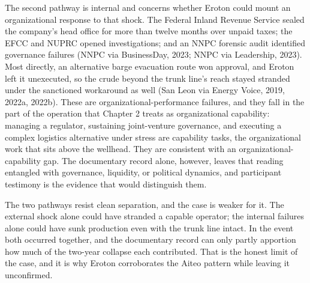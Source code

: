 The second pathway is internal and concerns whether Eroton could mount
an organizational response to that shock. The Federal Inland Revenue
Service sealed the company's head office for more than twelve months
over unpaid taxes; the EFCC and NUPRC opened investigations; and an NNPC
forensic audit identified governance failures (NNPC via BusinessDay,
2023; NNPC via Leadership, 2023). Most directly, an alternative barge
evacuation route won approval, and Eroton left it unexecuted, so the
crude beyond the trunk line's reach stayed stranded under the sanctioned
workaround as well (San Leon via Energy Voice, 2019, 2022a, 2022b).
These are organizational-performance failures, and they fall in the part
of the operation that Chapter 2 treats as organizational capability:
managing a regulator, sustaining joint-venture governance, and executing
a complex logistics alternative under stress are capability tasks, the
organizational work that sits above the wellhead. They are consistent
with an organizational-capability gap. The documentary record alone,
however, leaves that reading entangled with governance, liquidity, or
political dynamics, and participant testimony is the evidence that would
distinguish them.

The two pathways resist clean separation, and the case is weaker for it.
The external shock alone could have stranded a capable operator; the
internal failures alone could have sunk production even with the trunk
line intact. In the event both occurred together, and the documentary
record can only partly apportion how much of the two-year collapse each
contributed. That is the honest limit of the case, and it is why Eroton
corroborates the Aiteo pattern while leaving it unconfirmed.

